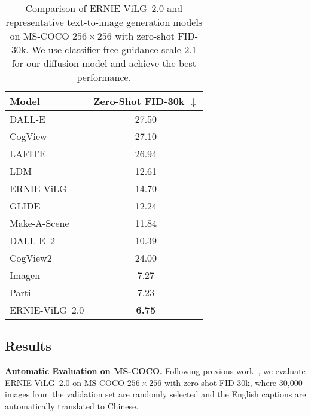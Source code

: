 \documentclass[10pt,twocolumn,letterpaper]{article}
\begin{document}
\begin{table}[t]
  \centering\small
  \caption{Comparison of ERNIE-ViLG~2.0 and representative text-to-image generation models on MS-COCO $256 \times 256$ with zero-shot FID-30k. We use classifier-free guidance scale 2.1 for our diffusion model and achieve the best performance.}
    \begin{tabular}{lc}
    \toprule
    \textbf{Model} & Zero-Shot FID-30k $\downarrow$  \\
    \midrule
    DALL-E~\cite{DBLP:conf/icml/RameshPGGVRCS21}          & 27.50 \\
    CogView~\cite{DBLP:conf/nips/DingYHZZYLZSYT21}        & 27.10 \\ LAFITE~\cite{DBLP:journals/corr/abs-2111-13792}       & 26.94 \\
    LDM~\cite{DBLP:journals/corr/abs-2112-10752}          & 12.61 \\
    ERNIE-ViLG~\cite{DBLP:journals/corr/abs-2112-15283}   & 14.70 \\
    GLIDE~\cite{DBLP:conf/icml/NicholDRSMMSC22}           & 12.24 \\
    Make-A-Scene~\cite{DBLP:journals/corr/abs-2203-13131} & 11.84 \\
    DALL-E~2~\cite{DBLP:journals/corr/abs-2204-06125}     & 10.39 \\
    CogView2~\cite{DBLP:journals/corr/abs-2204-14217}     & 24.00 \\
    Imagen~\cite{DBLP:journals/corr/abs-2205-11487}       & 7.27 \\
    Parti~\cite{DBLP:journals/corr/abs-2206-10789}        & 7.23 \\
    \midrule
ERNIE-ViLG~2.0 & \textbf{6.75} \\
    \bottomrule
    \end{tabular}\label{tab:main}\end{table}

\subsection{Results}

\noindent\textbf{Automatic Evaluation on MS-COCO.}
Following previous work~\cite{DBLP:journals/corr/abs-2112-10752,DBLP:journals/corr/abs-2204-06125,DBLP:journals/corr/abs-2205-11487}, we evaluate ERNIE-ViLG~2.0 on MS-COCO $256 \times 256$ with zero-shot FID-30k, where 30,000 images from the validation set are randomly selected and the English captions are automatically translated to Chinese.
\end{document}
